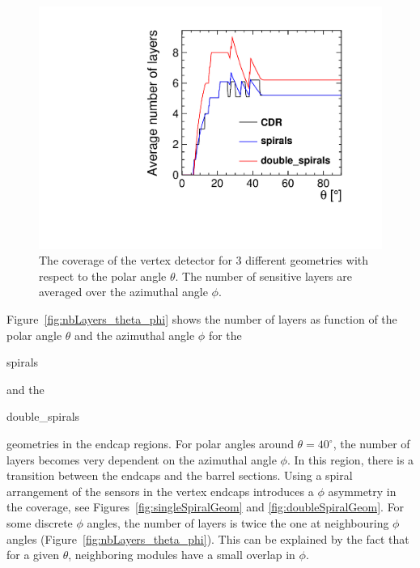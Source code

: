 \begin{figure}[H]
  \centering
  \includegraphics[scale=0.4]{Figures/Geometries/avg_nb_layers_allGeoms.pdf}
  \caption{The coverage of the vertex detector for 3 different geometries with respect to the polar angle $\theta$. The number of sensitive layers are averaged over the azimuthal angle $\phi$.}
  \label{fig:vertex_nb_layer}
\end{figure}

Figure~\ref{fig:nbLayers_theta_phi} shows the number of layers as function of the polar angle $\theta$ and the azimuthal angle $\phi$ for the \begin{it}spirals\end{it} and the \begin{it}double\_spirals\end{it} geometries in the endcap regions. For polar angles around $\theta=40^{\circ}$, the number of layers becomes very dependent on the azimuthal angle $\phi$. In this region, there is a transition between the endcaps and the barrel sections. Using a spiral arrangement of the sensors in the vertex endcaps introduces a $\phi$ asymmetry in the coverage, see Figures~\ref{fig:singleSpiralGeom} and \ref{fig:doubleSpiralGeom}.
For some discrete $\phi$ angles, the number of layers is twice the one
at neighbouring $\phi$ angles (Figure~\ref{fig:nbLayers_theta_phi}). This can be explained by the fact that for a given  $\theta$, neighboring modules have a small overlap in $\phi$.

